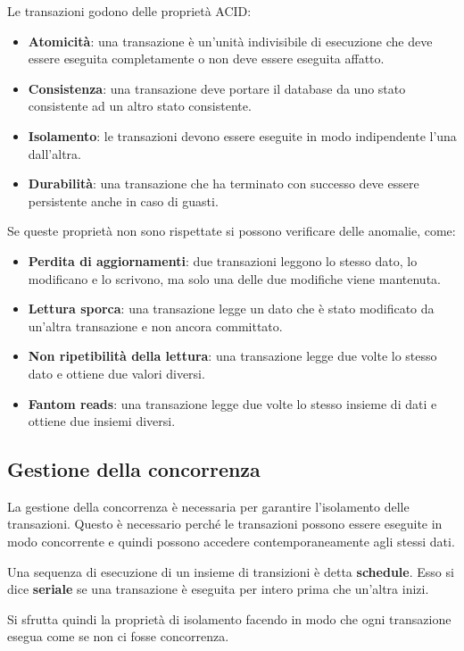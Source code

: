 Le transazioni godono delle proprietà ACID:
\begin{itemize}
      \item \textbf{Atomicità}: una transazione è un'unità indivisibile di
            esecuzione che deve essere eseguita completamente o non deve essere
            eseguita affatto.
      \item \textbf{Consistenza}: una transazione deve portare il database da uno
            stato consistente ad un altro stato consistente.
      \item \textbf{Isolamento}: le transazioni devono essere eseguite in modo
            indipendente l'una dall'altra.
      \item \textbf{Durabilità}: una transazione che ha terminato con successo
            deve essere persistente anche in caso di guasti.
\end{itemize}
Se queste proprietà non sono rispettate si possono verificare delle anomalie,
come:
\begin{itemize}
      \item \textbf{Perdita di aggiornamenti}: due transazioni leggono lo stesso
            dato, lo modificano e lo scrivono, ma solo una delle due modifiche
            viene mantenuta.
      \item \textbf{Lettura sporca}: una transazione legge un dato che è stato
            modificato da un'altra transazione e non ancora committato.
      \item \textbf{Non ripetibilità della lettura}: una transazione legge due
            volte lo stesso dato e ottiene due valori diversi.
      \item \textbf{Fantom reads}: una transazione legge due volte lo stesso
            insieme di dati e ottiene due insiemi diversi.
\end{itemize}
\subsection{Gestione della concorrenza}
La gestione della concorrenza è necessaria per garantire l'isolamento delle
transazioni. Questo è necessario perché le transazioni possono essere eseguite
in modo concorrente e quindi possono accedere contemporaneamente agli stessi
dati.
\begin{definizione}
      Una sequenza di esecuzione di un insieme di transizioni è detta \textbf{schedule}.
      Esso si dice \textbf{seriale} se una transazione è eseguita per intero prima
      che un'altra inizi.
\end{definizione}
Si sfrutta quindi la proprietà di isolamento facendo in modo che ogni
transazione esegua come se non ci fosse concorrenza.


